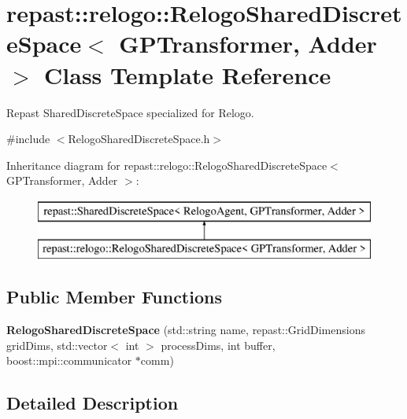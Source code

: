 \hypertarget{classrepast_1_1relogo_1_1_relogo_shared_discrete_space}{\section{repast\-:\-:relogo\-:\-:Relogo\-Shared\-Discrete\-Space$<$ G\-P\-Transformer, Adder $>$ Class Template Reference}
\label{classrepast_1_1relogo_1_1_relogo_shared_discrete_space}
}


Repast Shared\-Discrete\-Space specialized for Relogo.  




{\ttfamily \#include $<$Relogo\-Shared\-Discrete\-Space.\-h$>$}

Inheritance diagram for repast\-:\-:relogo\-:\-:Relogo\-Shared\-Discrete\-Space$<$ G\-P\-Transformer, Adder $>$\-:\begin{figure}[H]
\begin{center}
\leavevmode
\includegraphics[height=2.000000cm]{classrepast_1_1relogo_1_1_relogo_shared_discrete_space}
\end{center}
\end{figure}
\subsection*{Public Member Functions}
\begin{DoxyCompactItemize}
\item 
\hypertarget{classrepast_1_1relogo_1_1_relogo_shared_discrete_space_a4aec81146dee545c1c9cf98a32030f73}{{\bfseries Relogo\-Shared\-Discrete\-Space} (std\-::string name, repast\-::\-Grid\-Dimensions grid\-Dims, std\-::vector$<$ int $>$ process\-Dims, int buffer, boost\-::mpi\-::communicator $\ast$comm)}\label{classrepast_1_1relogo_1_1_relogo_shared_discrete_space_a4aec81146dee545c1c9cf98a32030f73}

\end{DoxyCompactItemize}


\subsection{Detailed Description}
